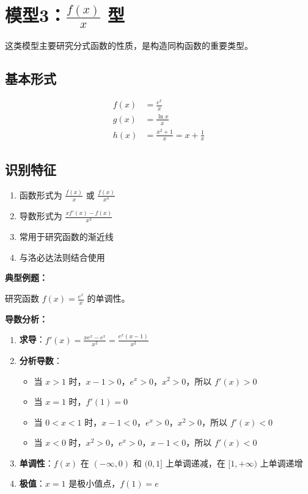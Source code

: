 \documentclass[a4paper,11pt]{ctexrep}
\newcommand{\exampleicon}{\ModeBadge[highlight]{例题}}
\newcommand{\analysisicon}{\ModeBadge[secondary]{分析}}
\theoremstyle{definition}
\begin{document}
\section{模型3：$\frac{f(x)}{x}$ 型}

这类模型主要研究分式函数的性质，是构造同构函数的重要类型。

\subsection{基本形式}

\begin{definitionbox}[分式型同构]
\begin{align}
f(x) &= \frac{e^x}{x} \\
g(x) &= \frac{\ln x}{x} \\
h(x) &= \frac{x^2 + 1}{x} = x + \frac{1}{x}
\end{align}
\end{definitionbox}

\subsection{识别特征}

\begin{tipbox}[分式型识别要点]
\begin{enumerate}
    \item 函数形式为 $\frac{f(x)}{x}$ 或 $\frac{f(x)}{x^n}$
    \item 导数形式为 $\frac{xf'(x) - f(x)}{x^2}$
    \item 常用于研究函数的渐近线
    \item 与洛必达法则结合使用
\end{enumerate}
\end{tipbox}

\exampleicon \textbf{典型例题：}

研究函数 $f(x) = \frac{e^x}{x}$ 的单调性。

\analysisicon \textbf{导数分析：}

\begin{enumerate}
    \item \textbf{求导}：$f'(x) = \frac{xe^x - e^x}{x^2} = \frac{e^x(x-1)}{x^2}$
    \item \textbf{分析导数}：
    \begin{itemize}
        \item 当 $x > 1$ 时，$x-1 > 0$，$e^x > 0$，$x^2 > 0$，所以 $f'(x) > 0$
        \item 当 $x = 1$ 时，$f'(1) = 0$
        \item 当 $0 < x < 1$ 时，$x-1 < 0$，$e^x > 0$，$x^2 > 0$，所以 $f'(x) < 0$
        \item 当 $x < 0$ 时，$x^2 > 0$，$e^x > 0$，$x-1 < 0$，所以 $f'(x) < 0$
    \end{itemize}
    \item \textbf{单调性}：$f(x)$ 在 $(-\infty, 0)$ 和 $(0, 1]$ 上单调递减，在 $[1, +\infty)$ 上单调递增
    \item \textbf{极值}：$x = 1$ 是极小值点，$f(1) = e$
\end{enumerate}
\end{document}
